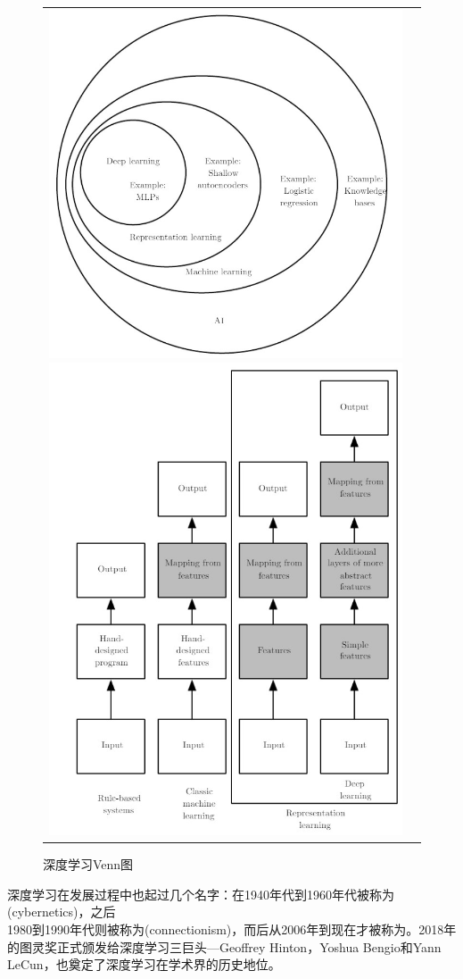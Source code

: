 \begin{figure}[H]
\centering
\begin{tabular}{cc}
\includegraphics[width=0.5\linewidth]{fig/dl_venn.jpg}
\includegraphics[width=0.5\linewidth]{fig/dl_flowchart.jpg}
\end{tabular}
\caption{深度学习Venn图}
\label{fig:venn}
\end{figure}

深度学习在发展过程中也起过几个名字：在1940年代到1960年代被称为(cybernetics)，之后\\
1980到1990年代则被称为(connectionism)，而后从2006年到现在才被称为。2018年的图灵奖正式颁发给深度学习三巨头---Geoffrey Hinton，Yoshua Bengio和Yann LeCun，也奠定了深度学习在学术界的历史地位。

